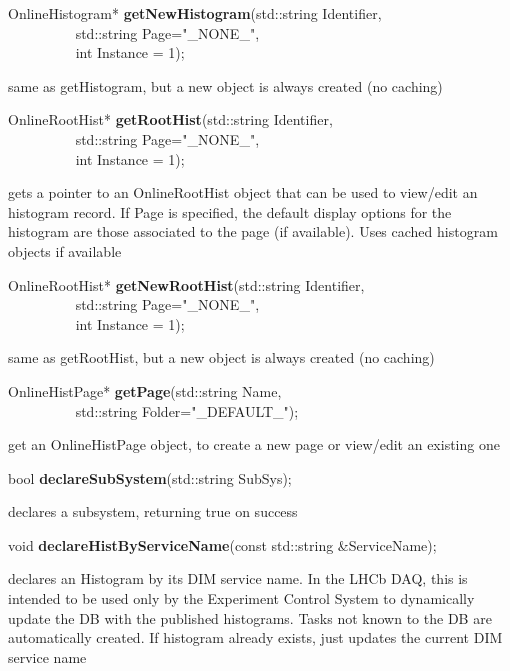 \item    OnlineHistogram* {\bf getNewHistogram}(std::string Identifier,\\\mbox{}~~~~~~~~~
				   std::string Page="\_NONE\_",\\\mbox{}~~~~~~~~~
				   int Instance = 1);

 same as getHistogram, but a new object is always created (no caching)


\item    OnlineRootHist* {\bf getRootHist}(std::string Identifier,\\\mbox{}~~~~~~~~~
			       std::string Page="\_NONE\_",\\\mbox{}~~~~~~~~~
			       int Instance = 1);

 gets a pointer to an OnlineRootHist object that can be used to view/edit an histogram record. If Page
 is specified, the default display options for the histogram are those associated to the page (if available).
 Uses cached histogram objects if available


\item    OnlineRootHist* {\bf getNewRootHist}(std::string Identifier,\\\mbox{}~~~~~~~~~
				 std::string Page="\_NONE\_",\\\mbox{}~~~~~~~~~
				 int Instance = 1);

 same as getRootHist, but a new object is always created (no caching)


\item    OnlineHistPage* {\bf getPage}(std::string Name,\\\mbox{}~~~~~~~~~ std::string Folder="\_DEFAULT\_");


 get an OnlineHistPage object, to create a new page or view/edit an existing one


\item    bool {\bf declareSubSystem}(std::string SubSys);


 declares a  subsystem, returning true on success


\item    void {\bf declareHistByServiceName}(const std::string \&ServiceName);


 declares an Histogram by its DIM service name. In the LHCb
 DAQ, this is intended to be used only by the Experiment Control
 System to dynamically update the DB with the published histograms.
 Tasks not known to the DB are automatically created.
 If histogram already exists, just updates the current DIM service name 


